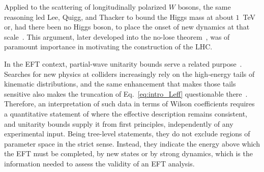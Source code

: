 Applied to the scattering of longitudinally
polarized $W$ bosons, the same reasoning led Lee, Quigg, and Thacker to bound the Higgs mass at
about $1$~TeV or, had there been no Higgs boson, to place the onset of new dynamics at that
scale~\cite{Lee:1977yc,Lee:1977eg}. This argument, later developed into the no-lose
theorem~\cite{Chanowitz:1985hj}, was of paramount importance in motivating the construction of the LHC.

In the EFT context, partial-wave unitarity bounds serve a related
purpose~\cite{Gounaris:1994cm,Corbett:2014ora,Corbett:2017qgl,DiLuzio:2016sur,DiLuzio:2017chi,Falkowski:2019tft,Chang:2019vez,Cohen:2021ucp,Brivio:2021fog,Cao:2023qks}.
Searches for new physics at colliders increasingly rely on the high-energy tails of
kinematic distributions, and the same enhancement that makes those tails sensitive also makes the
truncation of Eq.~\eqref{eq:intro_Leff} questionable there~\cite{Contino:2016jqw}. Therefore, an interpretation of such
data in terms of Wilson coefficients requires a quantitative statement of where the effective
description remains consistent, and unitarity bounds supply it from first principles, independently
of any experimental input. Being tree-level statements, they do not exclude regions of parameter
space in the strict sense. Instead, they indicate the energy above which the EFT must be completed,
by new states or by strong dynamics, which is the information needed to assess the validity of an
EFT analysis.

